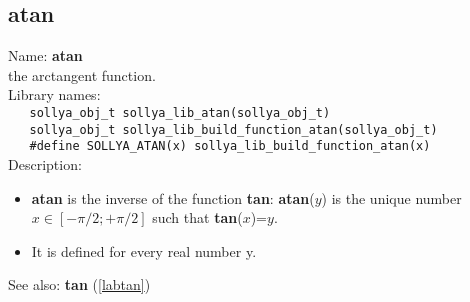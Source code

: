 \subsection{atan}
\label{labatan}
\noindent Name: \textbf{atan}\\
\phantom{aaa}the arctangent function.\\[0.2cm]
\noindent Library names:\\
\verb|   sollya_obj_t sollya_lib_atan(sollya_obj_t)|\\
\verb|   sollya_obj_t sollya_lib_build_function_atan(sollya_obj_t)|\\
\verb|   #define SOLLYA_ATAN(x) sollya_lib_build_function_atan(x)|\\[0.2cm]
\noindent Description: \begin{itemize}

\item \textbf{atan} is the inverse of the function \textbf{tan}: \textbf{atan}($y$) is the unique number 
   $x \in [-\pi/2; +\pi/2]$ such that \textbf{tan}($x$)=$y$.

\item It is defined for every real number y.
\end{itemize}
See also: \textbf{tan} (\ref{labtan})
